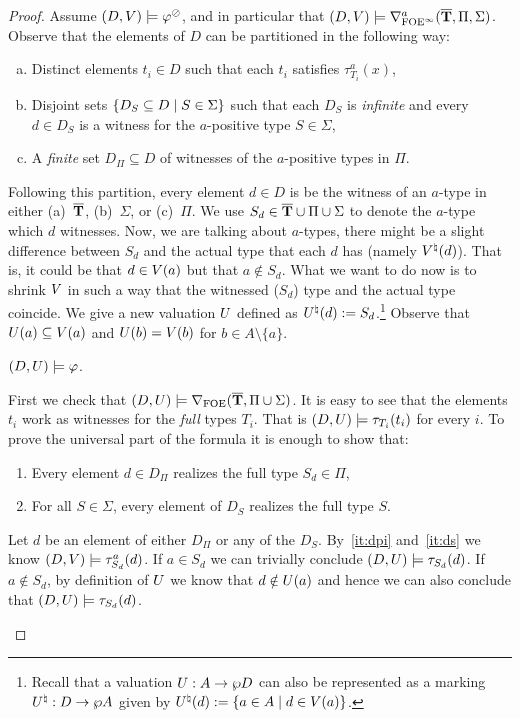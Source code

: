 \begin{proof}
\bigskip
\noindent \fbox{$\Leftarrow$}
Assume $(D,\val) \models \varphi^\tmono$, and in particular that $(D,\val) \models \mondbnfofoei{\vlist{T}}{\Pi}{\Sigma}{a}$.
Observe that the elements of $D$ can be partitioned in the following way:
%
\begin{enumerate}[(a)]
	 pt
	\item Distinct elements $t_i \in D$ such that each $t_i$ satisfies $\tau^{a}_{T_i}(x)$,%
	\item\label{it:dpi} Disjoint sets $\compset{D_S \subseteq D \mid S \in \Sigma}$ such that each $D_S$ is \emph{infinite} and every $d \in D_S$ is a witness for the $a$-positive type $S \in \Sigma$,
	\item\label{it:ds} A \emph{finite} set $D_\Pi \subseteq D$ of witnesses of the $a$-positive types in $\Pi$.
\end{enumerate}
%
Following this partition, every element $d\in D$ is be the witness of an $a$-type in either (a)~$\vlist{T}$, (b)~$\Sigma$, or (c)~$\Pi$. We use $S_d \in \vlist{T}\cup \Pi \cup \Sigma$ to denote the $a$-type which $d$ witnesses. Now, we are talking about $a$-types, there might be a slight difference between $S_d$ and the actual type that each $d$ has (namely $\val^\natural(d)$). That is, it could be that $d\in\val(a)$ but that $a\notin S_d$. What we want to do now is to shrink $\val$ in such a way that the witnessed ($S_d$) type and the actual type coincide. We give a new valuation $\uval$ defined as $\uval^\natural(d) := S_d$.\footnote{Recall that a valuation $\uval:A\to\wp \osmoddom$ can also be represented as a marking $\uval^\natural: \osmoddom\to\wp A$ given by $\uval^\natural(d) := \{a \in A \mid d\in \val(a)\}$.} Observe that $\uval(a) \subseteq \val(a)$ and $\uval(b) = \val(b)$ for $b\in A\setminus\{a\}$.
%
\begin{claimfirst}
	$(D,\uval) \models \varphi$.
\end{claimfirst}
%
\begin{pfclaim}
	First we check that $(D,\uval) \models \dbnfofoe{\vlist{T}}{\Pi \cup \Sigma}$. It is easy to see that the elements $t_i$ work as witnesses for the \emph{full} types $T_i$. That is $(D,\uval) \models \tau_{T_i}(t_i)$ for every $i$. To prove the universal part of the formula it is enough to show that:
	\begin{enumerate}
		 pt
		\item Every element $d\in D_\Pi$ realizes the full type $S_d \in \Pi$,
		\item For all $S\in \Sigma$, every element of $D_S$ realizes the full type $S$.
	\end{enumerate}
	Let $d$ be an element of either $D_\Pi$ or any of the $D_S$. By~\eqref{it:dpi} and~\eqref{it:ds} we know $(D,\val) \models \tau_{S_d}^a(d)$. If $a\in S_d$ we can trivially conclude $(D,\uval) \models \tau_{S_d}(d)$. If $a\notin S_d$, by definition of $\uval$ we know that $d \notin \uval(a)$ and hence we can also conclude that $(D,\uval) \models \tau_{S_d}(d)$.


\end{pfclaim}
\end{proof}
